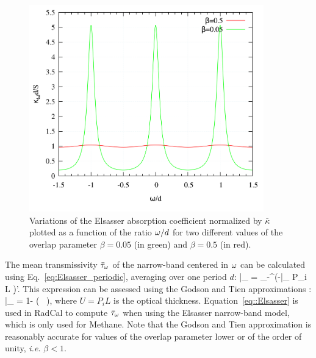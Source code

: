 \begin{figure}
\begin{center}
 \includegraphics[width=4.0in]{Figures/Elsasser_profile.png}
\end{center}
 \caption{Variations of the Elsasser absorption coefficient normalized by $\bar{\kappa}$ plotted as a function of the ratio $\omega/d$ for two different values of the overlap parameter $\beta = 0.05$ (in green) and $\beta = 0.5$ (in red). \label{fig:Elsasser_profile}}
\end{figure}
The mean transmissivity $\bar{\tau}_{\omega}$ of the narrow-band centered in $\omega$ can be calculated using Eq.~\ref{eq:Elsasser_periodic}, averaging over one period $d$:
\be
\bar{\tau}_{\om} = \displaystyle\int_{-}^{}{\exp\left(-\bar{\kappa}_{\om} P_i L \right)\d\om'}.
\ee
This expression can be assessed using the Godson and Tien approximations \cite{Brosmer1985b,Kunitomo1975}:
\be\label{eq::Elsasser}
    \bar{\tau}_{\om} = 1- \erf \left(  \,   \right),
\ee
where $U = P_iL$ is the optical thickness. Equation~\ref{eq::Elsasser} is used in RadCal to compute $\bar{\tau}_{\omega}$ when using the Elsasser narrow-band model, which is only used for Methane. Note that the Godson and Tien approximation is reasonably accurate for values of the overlap parameter lower or of the order of unity, \textit{i.e.} $\beta < 1$.
